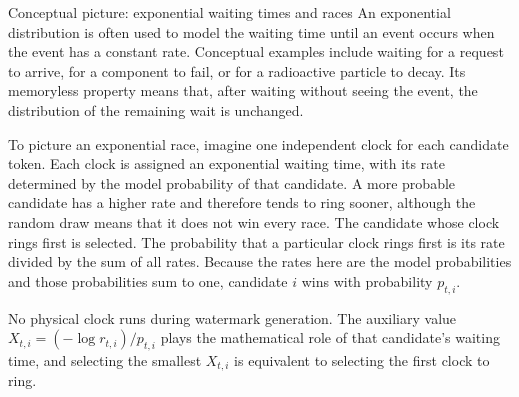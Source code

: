 \documentclass[11pt]{article}
\DeclareRobustCommand{\iperpaper}[2]{%
  \begingroup
  \hypersetup{pdfborder=0 0 0}%
  \href{iperpaper:#1}{{\color{iperpaperlink}#2}}%
  \endgroup
}
\def\iperpaper#1#2{#2}%
\begin{document}
\begin{leveltwo}{Conceptual picture: exponential waiting times and races}
An \iperpaper{exponential_distribution_concept}{exponential distribution} is often
used to model the waiting time until an event occurs when the event has a constant
rate. Conceptual examples include waiting for a request to arrive, for a component
to fail, or for a radioactive particle to decay. Its memoryless property means
that, after waiting without seeing the event, the distribution of the remaining
wait is unchanged.

To picture an \iperpaper{exponential_race_concept}{exponential race}, imagine one
independent clock for each candidate token. Each clock is assigned an exponential
waiting time, with its rate determined by the model probability of that candidate.
A more probable candidate has a higher rate and therefore tends to ring sooner,
although the random draw means that it does not win every race. The candidate
whose clock rings first is selected. The probability that a particular clock
rings first is its rate divided by the sum of all rates. Because the rates here
are the model probabilities and those probabilities sum to one, candidate $i$
wins with probability $p_{t,i}$.

No physical clock runs during watermark generation. The auxiliary value
$X_{t,i}=(-\log r_{t,i})/p_{t,i}$ plays the mathematical role of that candidate's
waiting time, and selecting the smallest $X_{t,i}$ is equivalent to selecting the
first clock to ring.
\end{leveltwo}
\end{document}

